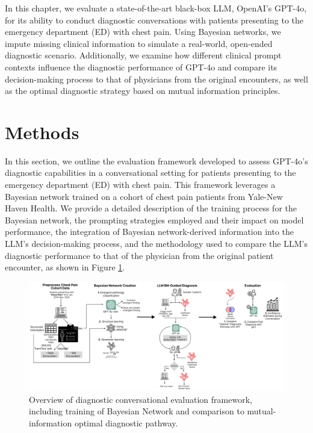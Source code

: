 In this chapter, we evaluate a state-of-the-art black-box LLM, OpenAI's GPT-4o, for its ability to conduct diagnostic conversations with patients presenting to the emergency department (ED) with chest pain. Using Bayesian networks, we impute missing clinical information to simulate a real-world, open-ended diagnostic scenario. Additionally, we examine how different clinical prompt contexts influence the diagnostic performance of GPT-4o and compare its decision-making process to that of physicians from the original encounters, as well as the optimal diagnostic strategy based on mutual information principles.


\section{Methods}

In this section, we outline the evaluation framework developed to assess GPT-4o’s diagnostic capabilities in a conversational setting for patients presenting to the emergency department (ED) with chest pain. This framework leverages a Bayesian network trained on a cohort of chest pain patients from Yale-New Haven Health. We provide a detailed description of the training process for the Bayesian network, the prompting strategies employed and their impact on model performance, the integration of Bayesian network-derived information into the LLM’s decision-making process, and the methodology used to compare the LLM’s diagnostic performance to that of the physician from the original patient encounter, as shown in Figure \ref{fig:aim3-overview}.


\begin{figure}[!htbp]
	\centering
	\includegraphics[width=1\textwidth] {figures/aim3/methods_overview.png}
	\caption{Overview of diagnostic conversational evaluation framework, including training of Bayesian Network and comparison to mutual-information optimal diagnostic pathway.} \label{fig:aim3-overview}
\end{figure}

